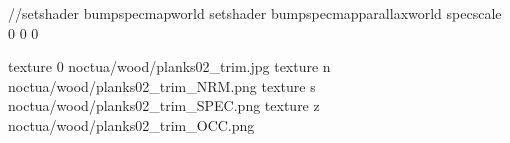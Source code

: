 //setshader bumpspecmapworld
setshader bumpspecmapparallaxworld
specscale 0 0 0

texture 0 noctua/wood/planks02_trim.jpg
texture n noctua/wood/planks02_trim_NRM.png
texture s noctua/wood/planks02_trim_SPEC.png
texture z noctua/wood/planks02_trim_OCC.png

